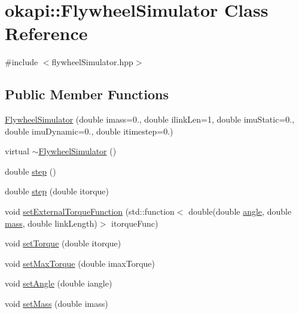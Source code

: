 \hypertarget{classokapi_1_1FlywheelSimulator}{}\section{okapi\+::Flywheel\+Simulator Class Reference}
\label{classokapi_1_1FlywheelSimulator}


{\ttfamily \#include $<$flywheel\+Simulator.\+hpp$>$}

\subsection*{Public Member Functions}
\begin{DoxyCompactItemize}
\item 
\mbox{\hyperlink{classokapi_1_1FlywheelSimulator_a8c7b4a6d86c64b3a5ec7e95b82b3486d}{Flywheel\+Simulator}} (double imass=0., double ilink\+Len=1, double imu\+Static=0., double imu\+Dynamic=0., double itimestep=0.)
\item 
virtual \mbox{\hyperlink{classokapi_1_1FlywheelSimulator_a915315e7bb395844e41d0bc9ae86409a}{$\sim$\+Flywheel\+Simulator}} ()
\item 
double \mbox{\hyperlink{classokapi_1_1FlywheelSimulator_a05ea33d225b636b14c7c8aab9ffb7fa8}{step}} ()
\item 
double \mbox{\hyperlink{classokapi_1_1FlywheelSimulator_a5da369045882dc962b1aff79eeaf1905}{step}} (double itorque)
\item 
void \mbox{\hyperlink{classokapi_1_1FlywheelSimulator_a288c47223f4e558c0081c91db1180430}{set\+External\+Torque\+Function}} (std\+::function$<$ double(double \mbox{\hyperlink{classokapi_1_1FlywheelSimulator_ab52c0add6fc410b93ce91ff29bf3c85b}{angle}}, double \mbox{\hyperlink{classokapi_1_1FlywheelSimulator_a889583a4674ea4e9a611c88a621deb3b}{mass}}, double link\+Length)$>$ itorque\+Func)
\item 
void \mbox{\hyperlink{classokapi_1_1FlywheelSimulator_a0e26fda9b8d46a12942a7ed5b8a0e399}{set\+Torque}} (double itorque)
\item 
void \mbox{\hyperlink{classokapi_1_1FlywheelSimulator_a3b7178f2680fa6533e1056db8f6b1656}{set\+Max\+Torque}} (double imax\+Torque)
\item 
void \mbox{\hyperlink{classokapi_1_1FlywheelSimulator_ad9decd27371e9058f97a49944f06b4a1}{set\+Angle}} (double iangle)
\item 
void \mbox{\hyperlink{classokapi_1_1FlywheelSimulator_a0a4b88f87de82603f49e49610fee1eb6}{set\+Mass}} (double imass)

\end{DoxyCompactItemize}
